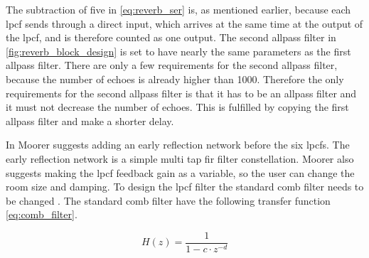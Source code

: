 The subtraction of five in \autoref{eq:reverb_ser} is, as mentioned earlier, because each \gls{lpcf} sends through a direct input, which arrives at the same time at the output of the \gls{lpcf}, and is therefore counted as one output.
The second allpass filter in \autoref{fig:reverb_block_design} is set to have nearly the same parameters as the first allpass filter. There are only a few requirements for the second allpass filter, because the number of echoes is already higher than 1000. Therefore the only requirements for the second allpass filter is that it has to be an allpass filter and it must not decrease the number of echoes. This is fulfilled by copying the first allpass filter and make a shorter delay. 
    
%

%


In \citep{DAFX} Moorer suggests adding an early reflection network before the six \gls{lpcf}s. The early reflection network is a simple multi tap \gls{fir} filter constellation. Moorer also suggests making the \gls{lpcf} feedback gain as a variable, so the user can change the room size and damping. To design the \gls{lpcf} filter the standard comb filter needs to be changed  \citep{LPCFfd}. The standard comb filter have the following transfer function \autoref{eq:comb_filter}.

\begin{equation}\label{eq:comb_filter}
H(z)=\frac{1}{1-c \cdot z^{-d}}
\end{equation}

    \startexplain
{}
    \stopexplain

